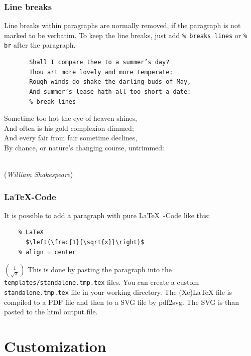 \documentclass{article}
\begin{document}
\section{Line breaks}

{Line breaks within paragraphs are normally removed, if the
paragraph is not marked to be verbatim. To keep the line
breaks, just add \texttt{\% breaks lines} or \texttt{\% br} after the paragraph.\\}

\begin{verbatim}
       Shall I compare thee to a summer’s day?
       Thou art more lovely and more temperate:
       Rough winds do shake the darling buds of May,
       And summer’s lease hath all too short a date:
       % break lines
\end{verbatim}


{Sometime too hot the eye of heaven shines,\\
And often is his gold complexion dimmed;\\
And every fair from fair sometime declines,\\
By chance, or nature’s changing course, untrimmed:\\\\}

{\raggedleft%
(\emph{William Shakespeare})\\}

\section{LaTeX-Code}

{It is possible to add a paragraph with pure \LaTeX\ -Code like
this:\\}

\begin{verbatim}
	% LaTeX
  	  $\left(\frac{1}{\sqrt{x}}\right)$  
	% align = center
\end{verbatim}


\centering%
  $\left(\frac{1}{\sqrt{x}}\right)$
{This is done by pasting the paragraph into the
\texttt{templates/}\texttt{standalone.tmp.tex} files. You can create a custom
\texttt{standalone.tmp.tex} file in your working directory.
The (Xe)LaTeX file is compiled to a PDF file and then to a
SVG file by pdf2svg. The SVG is than pasted to the html
output file.\\}

\part{Customization}
\end{document}
